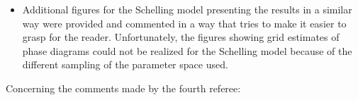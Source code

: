 \documentclass[11pt,a4paper,sans]{moderncv}        %
\begin{document}
\begin{itemize}
	\item Additional figures for the Schelling model presenting the results in a similar way were provided and commented in a way that tries to make it easier to grasp for the reader. Unfortunately, the figures showing grid estimates of phase diagrams could not be realized for the Schelling model because of the different sampling of the parameter space used.

\end{itemize}



 
Concerning the comments made by the fourth referee:
\end{document}
